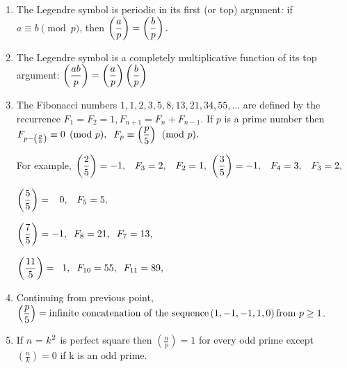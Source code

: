 \begin{enumerate}
            
            \item 
                The Legendre symbol is periodic in its first (or top) argument: if\ $\displaystyle a \equiv b
                    \pmod{p}$,
                    then
                    $\displaystyle \displaystyle \left(\frac{a}{p}\right)=\left(\frac{b}{p}\right).$

            
            \item 
                The Legendre symbol is a completely multiplicative function of its top argument:
                    $\displaystyle \displaystyle \left(\frac{ab}{p} \right) = \left(\frac{a}{p} \right)
                    \left(\frac{b}{p}
                    \right)$

            
            \item 
                The Fibonacci numbers $\displaystyle 1,1,2,3,5,8,13,21,34,55,…$ are defined by the recurrence
                    $\displaystyle
                    F_1 = F_2 = 1,F_{n+1} = F_n + F_{n-1}.$ If $\displaystyle p$ is a prime number then 
                    $\displaystyle \displaystyle F_{p-\left(\frac{p}{5}\right)} \equiv 0 {\pmod{p}}, \;\;F_p \equiv
                    \left(\frac{p}{5}\right) {\pmod{p}}.$

                For example,
                    $\displaystyle \displaystyle\left(\frac{2}{5}\right)=-1,\;\;\;F_3=2,\;\;\;F_2=1,$
                    $\displaystyle \displaystyle\left(\frac{3}{5}\right)=-1,\;\;\; F_4=3,\;\;\;F_3=2,$

                $\displaystyle \displaystyle\left(\frac{5}{5}\right)=\;\;\;0,\;\;\; F_5=5,$

                $\displaystyle \displaystyle\left(\frac{7}{5}\right)=-1,\;\; F_8=21,\;\;F_7=13,$

                $\displaystyle \displaystyle\left(\frac{11}{5}\right)=\;\;1,\;\; F_{10}=55,\;\;F_{11}=89,$

            
            \item Continuing from previous point, $\displaystyle \displaystyle \left(\frac{p}{5}\right)={\text{infinite
                concatenation of the sequence}}\left(1,-1,-1,1,0\right) {\text{from }}p \geq 1$.
            \item 
                If $n$ = $\displaystyle \displaystyle k^2$ is perfect square then $\displaystyle
                    \left(\frac{n}{p}\right)=1$
                    for every odd prime except $\displaystyle \left(\frac{n}{k}\right)=0$ if k is an odd prime.

            
        \end{enumerate}
